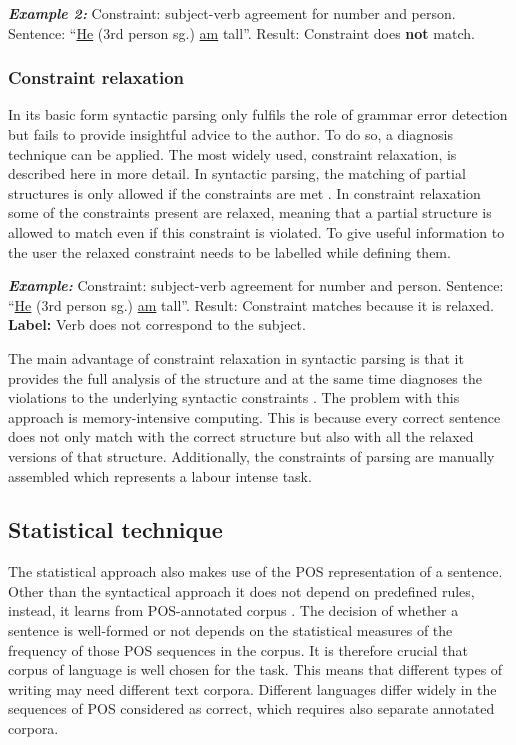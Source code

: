 \documentclass[runningheads]{llncs}
\begin{document}
\textbf{\textit{Example 2:}} Constraint: subject-verb agreement for number and person. Sentence: ``\underline{He} (3rd person sg.) \underline{am} tall''. Result: Constraint does \textbf{not} match.

\subsubsection{Constraint relaxation}
In its basic form syntactic parsing only fulfils the role of grammar error detection but fails to provide insightful advice to the author. To do so, a diagnosis technique can be applied. The most widely used, constraint relaxation, is described here in more detail. In syntactic parsing, the matching of partial structures is only allowed if the constraints are met \citep{vandeventer_creating_2001}. In constraint relaxation some of the constraints present are relaxed, meaning that a partial structure is allowed to match even if this constraint is violated. To give useful information to the user the relaxed constraint needs to be labelled while defining them. 

\textbf{\textit{Example:}} Constraint: subject-verb agreement for number and person. Sentence: ``\underline{He} (3rd person sg.) \underline{am} tall''. Result: Constraint matches because it is relaxed. \textbf{Label:} Verb does not correspond to the subject.

The main advantage of constraint relaxation in syntactic parsing is that it provides the full analysis of the structure and at the same time diagnoses the violations to the underlying syntactic constraints \citep{vandeventer_creating_2001}. The problem with this approach is memory-intensive computing. This is because every correct sentence does not only match with the correct structure but also with all the relaxed versions of that structure. Additionally, the constraints of parsing are manually assembled which represents a labour intense task. 

\subsection{Statistical technique}
The statistical approach also makes use of the POS representation of a sentence. Other than the syntactical approach it does not depend on predefined rules, instead, it learns from POS-annotated corpus \citep{manchanda_various_2016}. The decision of whether a sentence is well-formed or not depends on the statistical measures of the frequency of those POS sequences in the corpus. It is therefore crucial that corpus of language is well chosen for the task. This means that different types of writing may need different text corpora. Different languages differ widely in the sequences of POS considered as correct, which requires also separate annotated corpora.
\end{document}
